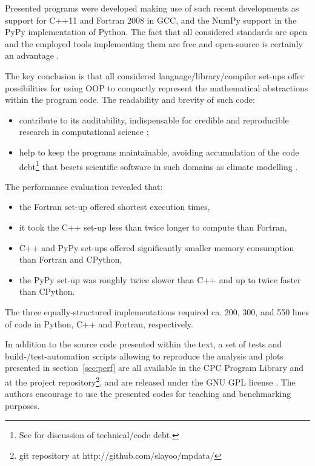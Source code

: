 \documentclass[final,5p,times,twocolumn]{elsarticle}
\newcommand{\url}[1]{{#1}}
\begin{document}
  Presented programs were developed making use of such recent
    developments as support for C++11 and Fortran 2008 in GCC, and
    the NumPy support in the PyPy implementation of Python.
  The fact that all considered standards are open and the employed
    tools implementing them are free and open-source
    is certainly an advantage \citep{Anel_2011}.

  The key conclusion is that all considered language/library/compiler
    set-ups offer possibilities for using OOP to compactly 
    represent the mathematical abstractions within the program code. 
  The readability and brevity of such code:
  \begin{itemize}
    \item{contribute to its 
      auditability, indispensable for credible and reproducible research in computational science 
      \citep{Post_et_al_2005, Merali_et_al_2010, Stodden_et_al_2012};
    }
    \item{help to keep the programs maintainable, avoiding accumulation of the code 
      debt\footnote{See \citet{Buschmann_2011} for discussion of technical/code debt.} 
      that besets scientific software in such domains as climate modelling
      \citep{Freeman_et_al_2010}.
    }
  \end{itemize}
    
  The performance evaluation revealed that:
    \begin{itemize}
      \item{the Fortran set-up offered shortest execution times,}
      \item{it took the C++ set-up less than twice longer to compute than Fortran,}
      \item{C++ and PyPy set-ups offered significantly smaller memory consumption 
        than Fortran and CPython,}
      \item{the PyPy set-up was roughly twice slower than C++ and up to twice faster than CPython.}
    \end{itemize}
  The three equally-structured implementations required ca. 200, 300, and 550 lines of code %
    in Python, C++ and Fortran, respectively.  

  In addition to the source code presented within the text,
    a set of tests and build-/test-automation scripts
    allowing to reproduce the analysis and plots presented in section~\ref{sec:perf} are all 
    available in the CPC Program Library and at
    the project repository\footnote{git repository at \url{http://github.com/slayoo/mpdata/}},
    and are released under the GNU GPL license \citep{GPLv3}.
  The authors encourage to use the presented codes for teaching and benchmarking purposes.
\end{document}
